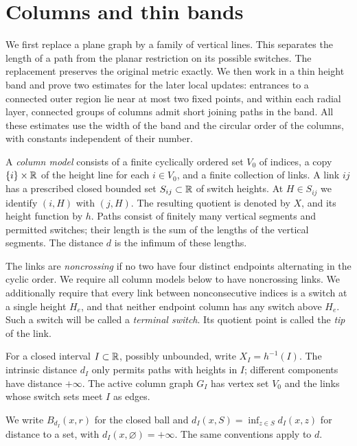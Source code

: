 \section{Columns and thin bands}\label{geo:section}

We first replace a plane graph by a family of vertical lines.  This separates
the length of a path from the planar restriction on its possible switches.
The replacement preserves the original metric exactly.  We then work in
a thin height band and prove two estimates for the later local updates:
entrances to a connected outer region lie near at most two fixed points,
and within each radial layer, connected groups of columns admit short
joining paths in the band.
All these estimates use the width of the band and the circular order of
the columns, with constants independent of their number.

\begin{definition}\label{geo:column-model}
A \emph{column model} consists of a finite cyclically ordered set $V_0$ of
indices, a copy $\{i\}\times\mathbb R$ of the height line for each $i\in V_0$, and
a finite collection of links.  A link $ij$ has a prescribed closed bounded
set $S_{ij}\subset\mathbb R$ of switch heights.  At $H\in S_{ij}$ we identify
$(i,H)$ with $(j,H)$.  The resulting quotient is denoted by $X$, and its
height function by $h$.  Paths consist of finitely many vertical segments
and permitted switches; their length is the sum of the lengths of the
vertical segments.  The distance $d$ is the infimum of these lengths.

The links are \emph{noncrossing} if no two have four distinct endpoints
alternating in the cyclic order.  We require all column models below to have
noncrossing links.  We additionally require that every link
between nonconsecutive indices is a switch at a single height $H_e$, and
that neither endpoint column has any switch above $H_e$.  Such a switch
will be called a \emph{terminal switch}.
Its quotient point is called the \emph{tip} of the link.

For a closed interval $I\subset\mathbb R$, possibly unbounded, write $X_I=h^{-1}(I)$.
The intrinsic distance $d_I$ only permits paths with heights in $I$;
different components have distance $+\infty$.  The active column graph
$G_I$ has vertex set $V_0$ and the links whose switch sets meet $I$ as edges.
\end{definition}

We write $B_{d_I}(x,r)$ for the closed ball and
$d_I(x,S)=\inf_{z\in S}d_I(x,z)$ for distance to a set, with
$d_I(x,\varnothing)=+\infty$. The same conventions apply to $d$.

